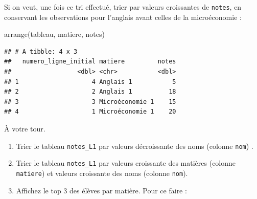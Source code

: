 \documentclass[
  11pt,
]{book}
\newcommand{\VERB}{\Verb[commandchars=\\\{\}]}
\newenvironment{Shaded}{\begin{snugshade}}{\end{snugshade}}
\newcommand{\FunctionTok}[1]{\textcolor[rgb]{0.00,0.00,0.00}{#1}}
\newcommand{\NormalTok}[1]{#1}
\providecommand{\tightlist}{%
  \setlength{\itemsep}{0pt}\setlength{\parskip}{0pt}}
\numberwithin{equation}{section}
\numberwithin{countremarque}{section}
\newenvironment{notebox}{
  \begin{tcolorbox}[breakable, colback=jaune,coltext=black,
                  colframe=grisfonce]}
 {\end{tcolorbox}}
\newenvironment{greenbox}{
  \begin{tcolorbox}[breakable, colback=vert,coltext=black,
                  colframe=grisfonce]}
 {\end{tcolorbox}}
\begin{document}
\begin{notebox}
Si on veut, une fois ce tri effectué, trier par valeurs croissantes de \texttt{notes}, en conservant les observations pour l'anglais avant celles de la microéconomie :

\begin{Shaded}
\begin{Highlighting}[]
\FunctionTok{arrange}\NormalTok{(tableau, matiere, notes)}
\end{Highlighting}
\end{Shaded}

\begin{lstlisting}
## # A tibble: 4 x 3
##   numero_ligne_initial matiere         notes
##                  <dbl> <chr>           <dbl>
## 1                    4 Anglais 1           5
## 2                    2 Anglais 1          18
## 3                    3 Microéconomie 1    15
## 4                    1 Microéconomie 1    20
\end{lstlisting}

\end{notebox}

\begin{greenbox}

À votre tour.

\begin{enumerate}
\def\labelenumi{\arabic{enumi}.}
\tightlist
\item
  Trier le tableau \texttt{notes\_L1} par valeurs décroissante des noms (colonne \texttt{nom}) .
\item
  Trier le tableau \texttt{notes\_L1} par valeurs croissante des matières (colonne \texttt{matiere}) et valeurs croissante des noms (colonne \texttt{nom}).
\item
  Affichez le top 3 des élèves par matière. Pour ce faire :
\end{enumerate}


\end{greenbox}
\end{document}
